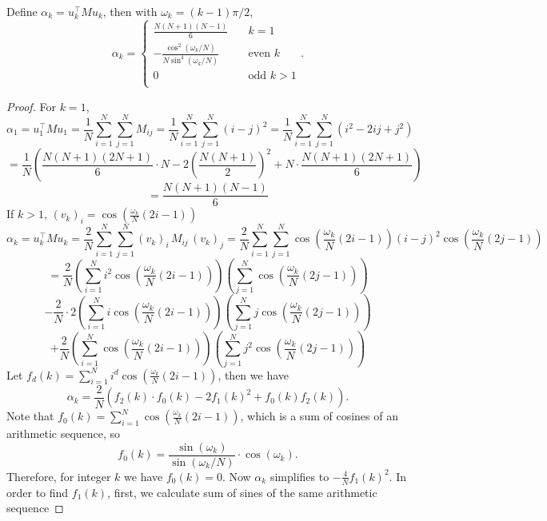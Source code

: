 \documentclass[10pt,a4paper]{amsart}
\begin{document}
\begin{lemma}
    Define $\alpha_k = u_k^\top M u_k$, then with $\omega_k=(k-1)\pi/2,$
    $$
\alpha_k = 
\begin{cases}
    \frac{N(N+1)(N-1)}{6} &\quad k = 1\\
    -\frac{\cos^2\left(\omega_k/N\right)}{N\sin^4\left(\omega_k/N\right)}&\quad \text{even } k\\
    0 &\quad \text{odd } k>1\\
\end{cases}.
$$

\end{lemma}

\begin{proof}
    For $k = 1$, 
    \[
    \alpha_1 = u_1^\top M u_1 = \frac{1}{N} \sum_{i=1}^N\sum_{j=1}^N M_{ij} = \frac{1}{N} \sum_{i=1}^N\sum_{j=1}^N (i-j)^2 = \frac{1}{N} \sum_{i=1}^N\sum_{j=1}^N (i^2-2ij+j^2)
    \]
    \[ 
    =\frac{1}{N} \left(\frac{N(N+1)(2N+1)}{6}\cdot N - 2\left(\frac{N(N+1)}{2}\right)^2+N\cdot \frac{N(N+1)(2N+1)}{6}\right)
    \]
    \[ 
    =\frac{N(N+1)(N-1)}{6}
    \]
    If $k>1$, $\left(v_k\right)_i = \cos\left(\frac{\omega_k}{N}(2i-1)\right)$
    \[
    \alpha_k = u_k^\top M u_k = \frac{2}{N} \sum_{i=1}^N\sum_{j=1}^N \left(v_{k}\right)_i\,M_{ij}\, \left(v_{k}\right)_j = \frac{2}{N} \sum_{i=1}^N\sum_{j=1}^N \cos\left( \frac{\omega_k}{N} (2i-1) \right)(i-j)^2\cos\left( \frac{\omega_k}{N} (2j-1) \right)
    \]
    \[= \frac{2}{N} \left(\sum_{i=1}^N i^2 \cos\left( \frac{\omega_k}{N} (2i-1) \right)\right)\left(\sum_{j=1}^N\cos\left( \frac{\omega_k}{N} (2j-1) \right)\right)
    \]
    \[- \frac{2}{N} \cdot 2\left(\sum_{i=1}^N i \cos\left( \frac{\omega_k}{N} (2i-1) \right)\right)\left(\sum_{j=1}^N j\cos\left( \frac{\omega_k}{N} (2j-1) \right)\right)
    \]
    \[+ \frac{2}{N} \left(\sum_{i=1}^N \cos\left( \frac{\omega_k}{N} (2i-1) \right)\right)\left(\sum_{j=1}^N j^2 \cos\left( \frac{\omega_k}{N} (2j-1) \right)\right)
    \]
    Let $f_d(k) = \sum_{i=1}^N i^d \cos\left(\frac{\omega_k}{N}(2i-1)\right)$, then we have \[
    \alpha_k = \frac{2}{N}\left(f_2(k)\cdot f_0(k)-2f_1(k)^2 + f_0(k)f_2(k)\right).
    \]
    Note that $f_0(k) = \sum_{i=1}^N \cos\left(\frac{\omega_k}{N}(2i-1)\right)$, which is a sum of cosines of an arithmetic sequence, so
    \[
    f_0(k) = \frac{\sin\left(\omega_k\right)}{\sin\left(\omega_k/N\right)}\cdot\cos\left(\omega_k\right).
    \]
    Therefore, for integer $k$ we have $f_0(k) = 0$.
    Now $\alpha_k$ simplifies to $-\frac{4}{N}f_1(k)^2$. In order to find $f_1(k)$, first, we calculate sum of sines of the same arithmetic sequence

\end{proof}
\end{document}
